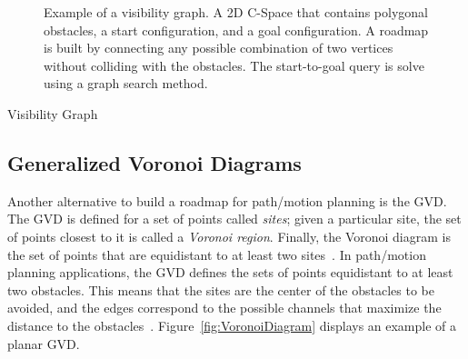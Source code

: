 \begin{figure}[htbp]
    \myfloatalign
     \quad
\caption[Example of a visibility graph.]
{Example of a visibility graph.
\protect {} A 2D C-Space that contains polygonal
obstacles, a start configuration, and a goal configuration.
\protect {} A roadmap is built by connecting any
possible combination of two vertices without colliding with the obstacles. The
start-to-goal query is solve using a graph search method.}
\label{fig:Visibility-Graph}
\end{figure}

\begin{algorithm}[htbp]
	\DontPrintSemicolon


	
	
 \caption{Visibility Graph}
 \label{alg:Visibility-Graph}
\end{algorithm}

\subsection{Generalized Voronoi Diagrams}

Another alternative to build a roadmap for path/motion planning is the \ac{GVD}.
The \ac{GVD} is defined for a set of points called \textit{sites}; given a
particular site, the set of points closest to it is called a \textit{Voronoi
region}. Finally, the Voronoi diagram is the set of points that are equidistant
to at least two sites~\cite{Aurenhammer1991}. In path/motion planning
applications, the \ac{GVD} defines the sets of points equidistant to at least
two obstacles. This means that the sites are the center of the obstacles to be
avoided, and the edges correspond to the possible channels that maximize the
distance to the obstacles~\cite{Choset2005}. Figure~\ref{fig:VoronoiDiagram}
displays an example of a planar \ac{GVD}.

